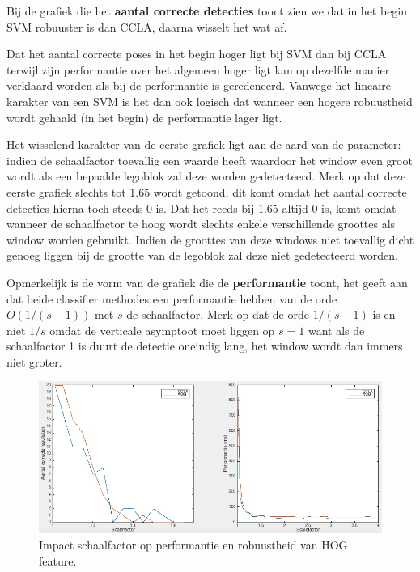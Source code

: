 Bij de grafiek die het \textbf{aantal correcte detecties} toont zien we dat in het begin SVM robuuster is dan CCLA, daarna wisselt het wat af.

Dat het aantal correcte poses in het begin hoger ligt bij SVM dan bij CCLA terwijl zijn performantie over het algemeen hoger ligt kan op dezelfde manier verklaard worden als bij de performantie is geredeneerd. Vanwege het lineaire karakter van een SVM is het dan ook logisch dat wanneer een hogere robuustheid wordt gehaald (in het begin) de performantie lager ligt. 

Het wisselend karakter van de eerste grafiek ligt aan de aard van de parameter: indien de schaalfactor toevallig een waarde heeft waardoor het window even groot wordt als een bepaalde legoblok zal deze worden gedetecteerd. Merk op dat deze eerste grafiek slechts tot 1.65 wordt getoond, dit komt omdat het aantal correcte detecties hierna toch steeds 0 is. Dat het reeds bij 1.65 altijd 0 is, komt omdat wanneer de schaalfactor te hoog wordt slechts enkele verschillende groottes als window worden gebruikt. Indien de groottes van deze windows niet toevallig dicht genoeg liggen bij de grootte van de legoblok zal deze niet gedetecteerd worden.

Opmerkelijk is de vorm van de grafiek die de \textbf{performantie} toont, het geeft aan dat beide classifier methodes een performantie hebben van de orde $O(1/(s-1))$ met $s$ de schaalfactor. Merk op dat de orde $1/(s-1)$ is en niet $1/s$ omdat de verticale asymptoot moet liggen op $s = 1$ want als de schaalfactor 1 is duurt de detectie oneindig lang, het window wordt dan immers niet groter.

\begin{figure}
  \centering
  \includegraphics[width=\linewidth]{img/scaleFact}
  \caption{Impact schaalfactor op performantie en robuustheid van HOG feature.}
  \label{fig:featScale}
\end{figure}

